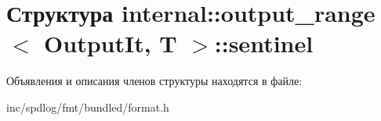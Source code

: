 \hypertarget{structinternal_1_1output__range_1_1sentinel}{}\section{Структура internal\+:\+:output\+\_\+range$<$ Output\+It, T $>$\+:\+:sentinel}
\label{structinternal_1_1output__range_1_1sentinel}


Объявления и описания членов структуры находятся в файле\+:\begin{DoxyCompactItemize}
\item 
inc/spdlog/fmt/bundled/format.\+h\end{DoxyCompactItemize}

